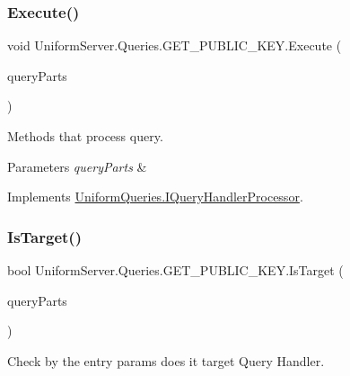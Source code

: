 \subsubsection{\texorpdfstring{Execute()}{Execute()}}
{\footnotesize\ttfamily void Uniform\+Server.\+Queries.\+G\+E\+T\+\_\+\+P\+U\+B\+L\+I\+C\+\_\+\+K\+E\+Y.\+Execute (\begin{DoxyParamCaption}\item[{\mbox{\hyperlink{struct_uniform_queries_1_1_query_part}{Query\+Part}} \mbox{[}$\,$\mbox{]}}]{query\+Parts }\end{DoxyParamCaption})}



Methods that process query. 


\begin{DoxyParams}{Parameters}
{\em query\+Parts} & \\
\hline
\end{DoxyParams}


Implements \mbox{\hyperlink{interface_uniform_queries_1_1_i_query_handler_processor_a2cf42ac286a12dea98c703a86478d36b}{Uniform\+Queries.\+I\+Query\+Handler\+Processor}}.

\mbox{\label{class_uniform_server_1_1_queries_1_1_g_e_t___p_u_b_l_i_c___k_e_y_ae27d462fe9ccbbf22ac03c9ead9cbe8f}} 
\subsubsection{\texorpdfstring{Is\+Target()}{IsTarget()}}
{\footnotesize\ttfamily bool Uniform\+Server.\+Queries.\+G\+E\+T\+\_\+\+P\+U\+B\+L\+I\+C\+\_\+\+K\+E\+Y.\+Is\+Target (\begin{DoxyParamCaption}\item[{\mbox{\hyperlink{struct_uniform_queries_1_1_query_part}{Query\+Part}} \mbox{[}$\,$\mbox{]}}]{query\+Parts }\end{DoxyParamCaption})}



Check by the entry params does it target Query Handler. 


